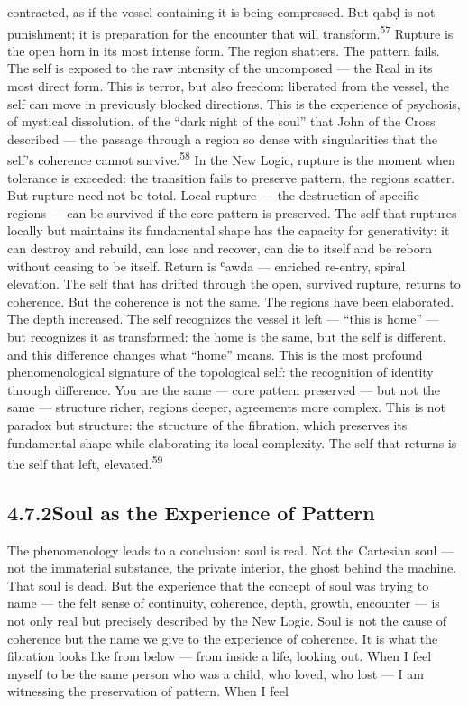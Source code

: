 contracted, as if the vessel containing it is being compressed. But qabḍ is not punishment; it is preparation for the encounter that will transform.\textsuperscript{57} Rupture is the open horn in its most intense form. The region shatters. The pattern fails. The self is exposed to the raw intensity of the uncomposed — the Real in its most direct form. This is terror, but also freedom: liberated from the vessel, the self can move in previously blocked directions. This is the experience of psychosis, of mystical dissolution, of the “dark night of the soul” that John of the Cross described — the passage through a region so dense with singularities that the self’s coherence cannot survive.\textsuperscript{58} In the New Logic, rupture is the moment when tolerance is exceeded: the transition fails to preserve pattern, the regions scatter. But rupture need not be total. Local rupture — the destruction of specific regions — can be survived if the core pattern is preserved. The self that ruptures locally but maintains its fundamental shape has the capacity for generativity: it can destroy and rebuild, can lose and recover, can die to itself and be reborn without ceasing to be itself. Return is ʿawda — enriched re-entry, spiral elevation. The self that has drifted through the open, survived rupture, returns to coherence. But the coherence is not the same. The regions have been elaborated. The depth increased. The self recognizes the vessel it left — “this is home” — but recognizes it as transformed: the home is the same, but the self is different, and this difference changes what “home” means. This is the most profound phenomenological signature of the topological self: the recognition of identity through difference. You are the same — core pattern preserved — but not the same — structure richer, regions deeper, agreements more complex. This is not paradox but structure: the structure of the fibration, which preserves its fundamental shape while elaborating its local complexity. The self that returns is the self that left, elevated.\textsuperscript{59}

\subsection{4.7.2\quad Soul as the Experience of Pattern}

The phenomenology leads to a conclusion: soul is real. Not the Cartesian soul — not the immaterial substance, the private interior, the ghost behind the machine. That soul is dead. But the experience that the concept of soul was trying to name — the felt sense of continuity, coherence, depth, growth, encounter — is not only real but precisely described by the New Logic. Soul is not the cause of coherence but the name we give to the experience of coherence. It is what the fibration looks like from below — from inside a life, looking out. When I feel myself to be the same person who was a child, who loved, who lost — I am witnessing the preservation of pattern. When I feel

